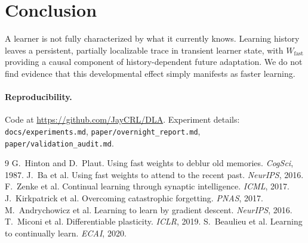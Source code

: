 \documentclass[11pt]{article}
\newcommand{\Wfast}{W_{\mathrm{fast}}}
\begin{document}
\section{Conclusion}
A learner is not fully characterized by what it currently knows. Learning history leaves a persistent, partially localizable trace in transient learner state, with $\Wfast$ providing a causal component of history-dependent future adaptation. We do not find evidence that this developmental effect simply manifests as faster learning.

\paragraph{Reproducibility.}
Code at \url{https://github.com/JayCRL/DLA}. Experiment details: \texttt{docs/experiments.md}, \texttt{paper/overnight_report.md}, \texttt{paper/validation_audit.md}.

\begin{thebibliography}{9}
 G.~Hinton and D.~Plaut. Using fast weights to deblur old memories. \emph{CogSci}, 1987.
 J.~Ba et al. Using fast weights to attend to the recent past. \emph{NeurIPS}, 2016.
 F.~Zenke et al. Continual learning through synaptic intelligence. \emph{ICML}, 2017.
 J.~Kirkpatrick et al. Overcoming catastrophic forgetting. \emph{PNAS}, 2017.
 M.~Andrychowicz et al. Learning to learn by gradient descent. \emph{NeurIPS}, 2016.
 T.~Miconi et al. Differentiable plasticity. \emph{ICLR}, 2019.
 S.~Beaulieu et al. Learning to continually learn. \emph{ECAI}, 2020.
\end{thebibliography}
\end{document}
